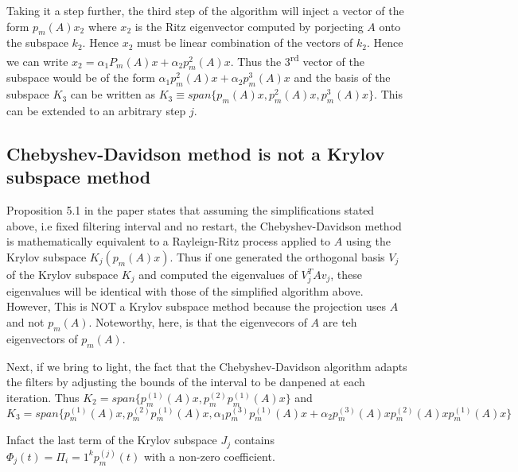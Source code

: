 \documentclass[10pt,a4paper,twoside]{report}
\theoremstyle{definition}
\begin{document}
	Taking it a step further, the third step of the algorithm will inject a vector of the form $p_m(A)x_2$ where $x_2$ is the Ritz eigenvector computed by porjecting $A$ onto the subspace $k_2$. Hence $x_2$ must be linear combination of the vectors of $k_2$. Hence we can write $x_2 = \alpha_1 P_m(A)x + \alpha_2 p_m^2(A)x$. Thus the 3\textsuperscript{rd} vector of the subspace would be of the form $\alpha_1 p_m^2(A)x + \alpha_2 p_m^3(A)x$ and the basis of the subspace $K_3$ can be written as $K_3 \equiv span\{p_m(A)x, p_m^2(A)x, p_m^3(A)x\}$. This can be extended to an arbitrary step $j$. 

	\subsection{Chebyshev-Davidson method is not a Krylov subspace method}
	Proposition 5.1 in the paper \cite{chebydav07} states that assuming the simplifications stated above, i.e fixed filtering interval and no restart, the Chebyshev-Davidson method is mathematically equivalent to a Rayleign-Ritz process applied to $A$ using the Krylov subspace $K_j(p_m(A)x)$. Thus if one generated the orthogonal basis $V_j$ of the Krylov subspace $K_j$ and computed the eigenvalues of $V_j^T A v_j$, these eigenvalues will be identical with those of the simplified algorithm above. However, This is NOT a Krylov subspace method because the projection uses $A$ and not $p_m(A)$. Noteworthy, here, is that the eigenvecors of $A$ are teh eigenvectors of $p_m(A)$.

	Next, if we bring to light, the fact that the Chebyshev-Davidson algorithm adapts the filters by adjusting the bounds of the interval to be danpened at each iteration. Thus $K_2 = span\{p_m^{(1)}(A)x, p_m^{(2)}p_m^{(1)}(A)x\}$ and 
	$$ K_3 = span\{p_m^{(1)}(A)x, p_m^{(2)}p_m^{(1)}(A)x, \alpha_1p_m^{(3)}p_m^{(1)}(A)x + \alpha_2p_m^{(3)}(A)xp_m^{(2)}(A)xp_m^{(1)}(A)x \} $$

	Infact the last term of the Krylov subspace $J_j$ contains $\Phi_j(t) = \Pi_i=1^k p_m^(j)(t)$ with a non-zero coefficient. 

	\thispagestyle{fancy}
	
	 

	\nocite{}
\end{document}
